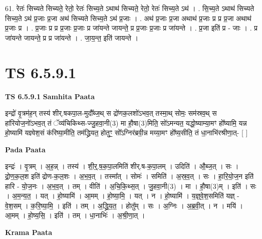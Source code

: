 \documentclass[17pt]{extarticle}
\begin{document}
61. रेतः॑ सिच्यते सिच्यते॒ रेतो॒ रेतः॑ सिच्य॒ते ऽथाथ॑ सिच्यते॒ रेतो॒ रेतः॑ सिच्य॒ते ऽथ॑ । . सि॒च्य॒ते ऽथाथ॑ सिच्यते सिच्य॒ते ऽथ॑ प्र॒जाः प्र॒जा अथ॑ सिच्यते सिच्य॒ते ऽथ॑ प्र॒जाः । . अथ॑ प्र॒जाः प्र॒जा अथाथ॑ प्र॒जाः प्र प्र प्र॒जा अथाथ॑ प्र॒जाः प्र । . प्र॒जाः प्र प्र प्र॒जाः प्र॒जाः प्र जा॑यन्ते जायन्ते॒ प्र प्र॒जाः प्र॒जाः प्र जा॑यन्ते । . प्र॒जा इति॑ प्र - जाः । . प्र जा॑यन्ते जायन्ते॒ प्र प्र जा॑यन्ते । . जा॒य॒न्त॒ इति॑ जायन्ते । \newline
\pagebreak
{}

\section{ TS 6.5.9.1 }

\textbf{TS 6.5.9.1 } \newline
\textbf{Samhita Paata} \newline

इन्द्रो॑ वृ॒त्रम॑ह॒न् तस्य॑ शीर्.षकपा॒ल-मुदौ᳚ब्ज॒थ् स द्रो॑णक॒लशो॑ऽभव॒त् तस्मा॒थ् सोमः॒ सम॑स्रव॒थ् स हा॑रियोज॒नो॑ऽभव॒त् तं ॅव्य॑चिकिथ्स-ज्जु॒हवा॒नी(3) मा हौ॒षा(3)मिति॒ सो॑ऽमन्यत॒ यद्धो॒ष्याम्या॒मꣳ हो᳚ष्यामि॒ यन्न हो॒ष्यामि॑ यज्ञ्वेश॒सं क॑रिष्या॒मीति॒ तम॑द्ध्रियत॒ होतुꣳ॒॒ सो᳚ऽग्निर॑ब्रवी॒न्न मय्या॒मꣳ हो᳚ष्य॒सीति॒ तं धा॒नाभि॑रश्रीणा॒त्- [  ] \newline

\textbf{Pada Paata} \newline

इन्द्रः॑ । वृ॒त्रम् । अ॒ह॒न्न् । तस्य॑ । शी॒र्॒.ष॒क॒पा॒लमिति॑ शीर्.ष-क॒पा॒लम् । उदिति॑ । औ॒ब्ज॒त् । सः । द्रो॒ण॒क॒ल॒श इति॑ द्रोण-क॒ल॒शः । अ॒भ॒व॒त् । तस्मा᳚त् । सोमः॑ । समिति॑ । अ॒स्र॒व॒त् । सः । हा॒रि॒यो॒ज॒न इति॑ हारि - यो॒ज॒नः । अ॒भ॒व॒त् । तम् । वीति॑ । अ॒चि॒कि॒थ्स॒त् । जु॒हवा॒नी(3) । मा । हौ॒षा(3)म् । इति॑ । सः । अ॒म॒न्य॒त॒ । यत् । हो॒ष्यामि॑ । आ॒मम् । हो॒ष्या॒मि॒ । यत् । न । हो॒ष्यामि॑ । य॒ज्ञ्॒वे॒श॒समिति॑ यज्ञ् - वे॒श॒सम् । क॒रि॒ष्या॒मि॒ । इति॑ । तम् । अ॒द्ध्रि॒य॒त॒ । होतु᳚म् । सः । अ॒ग्निः । अ॒ब्र॒वी॒त् । न । मयि॑ । आ॒मम् । हो॒ष्य॒सि॒ । इति॑ । तम् । धा॒नाभिः॑ । अ॒श्री॒णा॒त् ।  \newline


\textbf{Krama Paata} \newline
\end{document}
